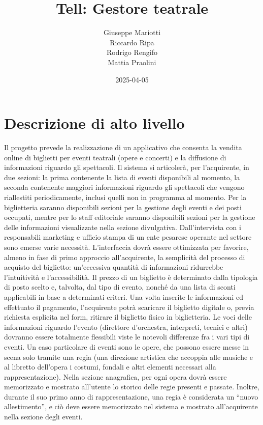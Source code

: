 \documentclass{article}
\title{Tell: Gestore teatrale}
\date{2025-04-05}
\author
{
    Giuseppe Mariotti\\
    Riccardo Ripa\\
    Rodrigo Rengifo\\
    Mattia Praolini
}
\begin{document}
    \maketitle
    \newpage

    \section{Descrizione di alto livello}
        Il progetto prevede la realizzazione di un applicativo che consenta la vendita online di biglietti per eventi teatrali (opere e concerti) e la diffusione di informazioni riguardo gli spettacoli. Il sistema si articolerà, per l’acquirente, in due sezioni: la prima contenente la lista di eventi disponibili al momento, la seconda contenente maggiori informazioni riguardo gli spettacoli che vengono riallestiti periodicamente, inclusi quelli non in programma al momento. Per la biglietteria saranno disponibili sezioni per la gestione degli eventi e dei posti occupati, mentre per lo staff editoriale saranno disponibili sezioni per la gestione delle informazioni visualizzate nella sezione divulgativa. Dall’intervista con i responsabili marketing e ufficio stampa di un ente pesarese operante nel settore sono emerse varie necessità. L’interfaccia dovrà essere ottimizzata per favorire, almeno in fase di primo approccio all’acquirente, la semplicità del processo di acquisto del biglietto: un’eccessiva quantità di informazioni ridurrebbe l’intuitività e l’accessibilità. Il prezzo di un biglietto è determinato dalla tipologia di posto scelto e, talvolta, dal tipo di evento, nonché da una lista di sconti applicabili in base a determinati criteri. Una volta inserite le informazioni ed effettuato il pagamento, l’acquirente potrà scaricare il biglietto digitale o, previa richiesta esplicita nel form, ritirare il biglietto fisico in biglietteria. Le voci delle informazioni riguardo l’evento (direttore d’orchestra, interpreti, tecnici e altri) dovranno essere totalmente flessibili viste le notevoli differenze fra i vari tipi di eventi. Un caso particolare di eventi sono le opere, che possono essere messe in scena solo tramite una regia (una direzione artistica che accoppia alle musiche e al libretto dell’opera i costumi, fondali e altri elementi necessari alla rappresentazione). Nella sezione anagrafica, per ogni opera dovrà essere memorizzato e mostrato all’utente lo storico delle regie presenti e passate. Inoltre, durante il suo primo anno di rappresentazione, una regia è considerata un “nuovo allestimento”, e ciò deve essere memorizzato nel sistema e mostrato all’acquirente nella sezione degli eventi.
    \newpage
\end{document}
